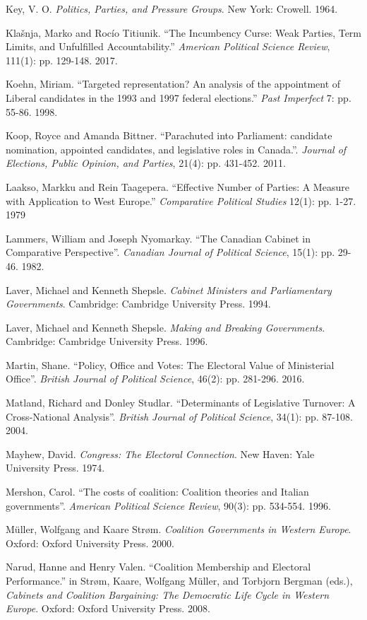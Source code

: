 \documentclass[letter,12pt]{article}
\begin{document}
\begin{hangparas}{.25in}{1}
Key, V. O. \textit{Politics, Parties, and Pressure Groups}. New York: Crowell. 1964.

Kla\v{s}nja, Marko and Roc\'{i}o Titiunik. ``The Incumbency Curse: Weak Parties, Term Limits, and Unfulfilled Accountability.'' \textit{American Political Science Review}, 111(1): pp. 129-148. 2017.

Koehn, Miriam. ``Targeted representation? An analysis of the appointment of Liberal candidates in the 1993 and 1997 federal elections.'' \textit{Past Imperfect} 7: pp. 55-86. 1998.

Koop, Royce and Amanda Bittner. ``Parachuted into Parliament: candidate nomination, appointed candidates, and legislative roles in Canada.''. \textit{Journal of Elections, Public Opinion, and Parties}, 21(4): pp. 431-452. 2011.

Laakso, Markku and Rein Taagepera. ``Effective Number of Parties: A Measure with Application to West Europe.'' \textit{Comparative Political Studies} 12(1): pp. 1-27. 1979

Lammers, William and Joseph Nyomarkay. ``The Canadian Cabinet in Comparative Perspective''. \textit{Canadian Journal of Political Science}, 15(1): pp. 29-46. 1982.

Laver, Michael and Kenneth Shepsle. \textit{Cabinet Ministers and Parliamentary Governments}. Cambridge: Cambridge University Press. 1994.

Laver, Michael and Kenneth Shepsle. \textit{Making and Breaking Governments}. Cambridge: Cambridge University Press. 1996.

Martin, Shane. ``Policy, Office and Votes: The Electoral Value of Ministerial Office''. \textit{British Journal of Political Science}, 46(2): pp. 281-296. 2016.

Matland, Richard and Donley Studlar. ``Determinants of Legislative Turnover: A Cross-National Analysis''. \textit{British Journal of Political Science}, 34(1): pp. 87-108. 2004.

Mayhew, David. \textit{Congress: The Electoral Connection}. New Haven: Yale University Press. 1974.

Mershon, Carol. ``The costs of coalition: Coalition theories and Italian governments''. \textit{American Political Science Review}, 90(3): pp. 534-554. 1996.

M{\"u}ller, Wolfgang and Kaare Str{\o}m. \textit{Coalition Governments in Western Europe}. Oxford: Oxford University Press. 2000.

Narud, Hanne and Henry Valen. ``Coalition Membership and Electoral Performance.'' in Str{\o}m, Kaare, Wolfgang M{\"u}ller, and Torbjorn Bergman (eds.), \textit{Cabinets and Coalition Bargaining: The Democratic Life Cycle in Western Europe}. Oxford: Oxford University Press. 2008.


\end{hangparas}
\end{document}
